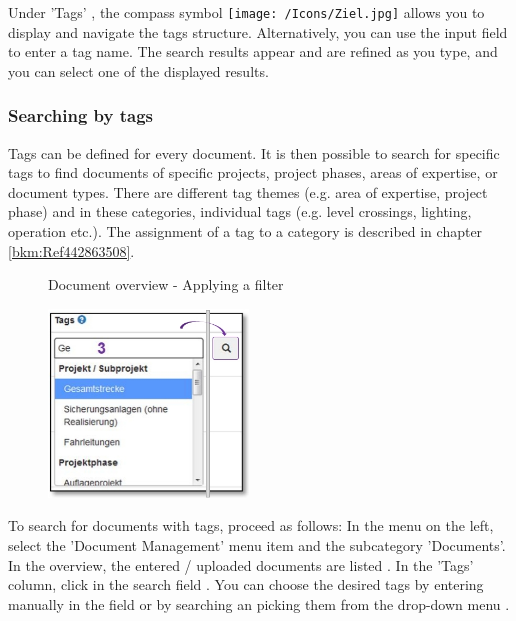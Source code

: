 Under 'Tags' , the compass symbol \texttt{[image: /Icons/Ziel.jpg]}  allows you to display and navigate the tags structure. Alternatively, you can use the input field  to enter a tag name. The search results appear and are refined as you type, and you can select one of the displayed results.



\subsubsection{Searching by tags}
\label{bkm:Ref442275849}

Tags can be defined for every document. It is then possible to search for specific tags to find documents of specific projects, project phases, areas of expertise, or document types. There are different tag themes (e.g. area of expertise, project phase) and in these categories, individual tags (e.g. level crossings, lighting, operation etc.). The assignment of a tag to a category is described in chapter \ref{bkm:Ref442863508}.

\begin{figure}[H]
\caption{Document overview - Applying a filter}
\end{figure}

\pagebreak

\begin{figure}
\vspace{-10pt}
\includegraphics[height=50mm]{../chapters/11_Dokumentenablage/pictures/11-2-8_DokTagHinzufuegen.jpg}
\end{figure}
To search for documents with tags, proceed as follows:
In the menu on the left, select the 'Document Management' menu item and the subcategory 'Documents'. In the overview, the entered / uploaded documents are listed . In the 'Tags' column, click in the search field . You can choose the desired tags by entering manually in the field or by searching an picking them from the drop-down menu .

